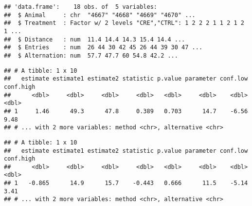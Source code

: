 \documentclass[]{article}
\newenvironment{Shaded}{\begin{snugshade}}{\end{snugshade}}
\newcommand{\DataTypeTok}[1]{\textcolor[rgb]{0.13,0.29,0.53}{#1}}
\newcommand{\KeywordTok}[1]{\textcolor[rgb]{0.13,0.29,0.53}{\textbf{#1}}}
\newcommand{\NormalTok}[1]{#1}
\newcommand{\OperatorTok}[1]{\textcolor[rgb]{0.81,0.36,0.00}{\textbf{#1}}}
\newcommand{\StringTok}[1]{\textcolor[rgb]{0.31,0.60,0.02}{#1}}
\begin{document}
\begin{verbatim}
## 'data.frame':    18 obs. of  5 variables:
##  $ Animal     : chr  "4667" "4668" "4669" "4670" ...
##  $ Treatment  : Factor w/ 2 levels "CRE","CTRL": 1 2 2 2 1 1 2 1 2 1 ...
##  $ Distance   : num  11.4 14.4 14.3 15.4 14.4 ...
##  $ Entries    : num  26 44 30 42 45 26 44 39 30 47 ...
##  $ Alternation: num  57.7 47.7 60 54.8 42.2 ...
\end{verbatim}

\begin{Shaded}
\end{Shaded}

\begin{verbatim}
## # A tibble: 1 x 10
##   estimate estimate1 estimate2 statistic p.value parameter conf.low conf.high
##      <dbl>     <dbl>     <dbl>     <dbl>   <dbl>     <dbl>    <dbl>     <dbl>
## 1     1.46      49.3      47.8     0.389   0.703      14.7    -6.56      9.48
## # ... with 2 more variables: method <chr>, alternative <chr>
\end{verbatim}

\begin{Shaded}
\end{Shaded}

\begin{verbatim}
## # A tibble: 1 x 10
##   estimate estimate1 estimate2 statistic p.value parameter conf.low conf.high
##      <dbl>     <dbl>     <dbl>     <dbl>   <dbl>     <dbl>    <dbl>     <dbl>
## 1   -0.865      14.9      15.7    -0.443   0.666      11.5    -5.14      3.41
## # ... with 2 more variables: method <chr>, alternative <chr>
\end{verbatim}
\end{document}

